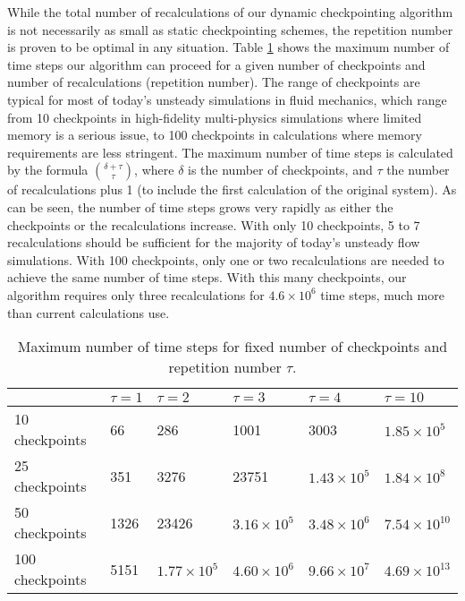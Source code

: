 While the total number of recalculations of our dynamic checkpointing
algorithm is not necessarily as small as static checkpointing schemes, the
repetition number is proven to be optimal in any situation.
Table \ref{tab1} shows the maximum number of time steps our algorithm can
proceed for a
given number of checkpoints and number of recalculations (repetition number).
The range of
checkpoints are typical for most of today's unsteady simulations in fluid
mechanics, which range from 10 checkpoints in high-fidelity multi-physics
simulations where limited memory is a serious issue, to 100 checkpoints in
calculations where memory requirements are less stringent.  The maximum number
of time steps is calculated by the formula $\binom{\delta + \tau}{\tau}$,
where $\delta$ is the number of checkpoints, and $\tau$ the number of
recalculations plus 1 (to include the first calculation of the original
system).  As can be seen, the number of time steps grows very rapidly as either
the checkpoints or the recalculations increase.  With only 10 checkpoints,
5 to 7 recalculations should be sufficient for the majority of today's unsteady
flow simulations.  With 100 checkpoints, only one or two recalculations are
needed to achieve the same number of time steps.  With this many checkpoints,
our algorithm requires only three recalculations for $4.6 \times 10^6$ time
steps, much more than current calculations use.
\begin{table}[htb!] \center
\label{tab1}
\caption{Maximum number of time steps for fixed number of checkpoints and
         repetition number $\tau$.}
\begin{tabular}{llllll}
\\
\hline
& $\tau=1$ & $\tau=2$ & $\tau=3$ & $\tau=4$ & $\tau=10$ \\
\hline
10 checkpoints & 66  & 286  & 1001  & 3003 & $1.85 \times 10^5$ \\
25 checkpoints & 351 & 3276 & 23751 & $1.43 \times 10^5$ &
                 $1.84 \times 10^8$ \\
50 checkpoints & 1326 & 23426 & $3.16 \times 10^5$ & $3.48 \times 10^6$ &
                 $7.54 \times 10^{10}$ \\
100 checkpoints & 5151 & $1.77 \times 10^5$ & $4.60 \times 10^6$ & 
                  $9.66 \times 10^7$ & $4.69 \times 10^{13}$ \\
\hline
\end{tabular}
\end{table}

